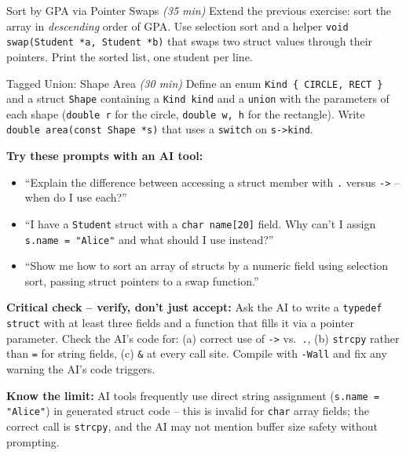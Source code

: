 \documentclass[11pt]{article}
\begin{document}
\begin{labexercise}{Sort by GPA via Pointer Swaps \hfill {\small \itshape (35 min)}}
Extend the previous exercise: sort the array in \emph{descending} order of GPA.
Use selection sort and a helper \texttt{void swap(Student *a, Student *b)} that swaps
two struct values through their pointers. Print the sorted list, one student per line.
\end{labexercise}

\begin{labexercise}{Tagged Union: Shape Area \hfill {\small \itshape (30 min)}}
Define an enum \texttt{Kind \{ CIRCLE, RECT \}} and a struct \texttt{Shape} containing
a \texttt{Kind kind} and a \texttt{union} with the parameters of each shape
(\texttt{double r} for the circle, \texttt{double w, h} for the rectangle).
Write \texttt{double area(const Shape *s)} that uses a \texttt{switch} on \texttt{s->kind}.
\end{labexercise}

\begin{aicollab}
\textbf{Try these prompts with an AI tool:}
\begin{itemize}[leftmargin=*,nosep]
  \item ``Explain the difference between accessing a struct member with \texttt{.}
        versus \texttt{->} -- when do I use each?''
  \item ``I have a \texttt{Student} struct with a \texttt{char name[20]} field.
        Why can't I assign \texttt{s.name = "Alice"} and what should I use instead?''
  \item ``Show me how to sort an array of structs by a numeric field using selection
        sort, passing struct pointers to a swap function.''
\end{itemize}

\medskip\textbf{Critical check -- verify, don't just accept:}
Ask the AI to write a \texttt{typedef struct} with at least three fields and a function
that fills it via a pointer parameter. Check the AI's code for:
(a) correct use of \texttt{->} vs.\ \texttt{.},
(b) \texttt{strcpy} rather than \texttt{=} for string fields,
(c) \texttt{\&} at every call site.
Compile with \texttt{-Wall} and fix any warning the AI's code triggers.

\medskip\textbf{Know the limit:}
AI tools frequently use direct string assignment (\texttt{s.name = "Alice"}) in generated
struct code -- this is invalid for \texttt{char} array fields; the correct call is
\texttt{strcpy}, and the AI may not mention buffer size safety without prompting.
\end{aicollab}
\end{document}
